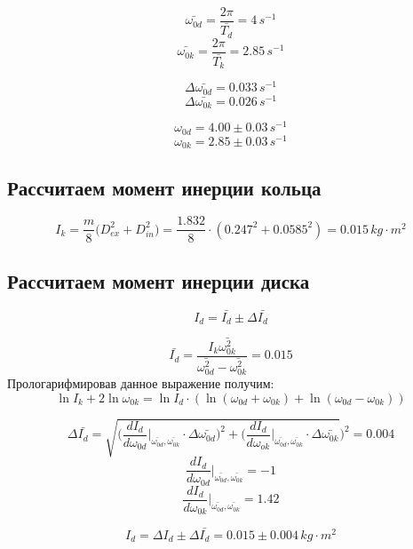 \documentclass[a4paper,12pt]{report}
\begin{document}
\[ \bar{\omega_{0d}} = \frac{2\pi}{\bar{T_d}} = 4 \, s^{-1} \]
\[ \bar{\omega_{0k}} = \frac{2\pi}{\bar{T_k}} = 2.85 \, s^{-1} \]

\[ \Delta \bar{\omega_{0d}} = 0.033 \, s^{-1} \]
\[ \Delta \bar{\omega_{0k}} =  0.026 \, s^{-1}\]

\[ \omega_{0d} = 4.00 \pm 0.03 \, s^{-1} \]
\[ \omega_{0k} = 2.85 \pm 0.03 \, s^{-1} \]

\subsection*{Рассчитаем момент инерции кольца}

\[ I_k = \frac{m}{8}\biggl( D_{ex}^2 + D_{in}^2\biggr) = \frac{1.832}{8} \cdot (0.247^2 + 0.0585^2) = 0.015 \, kg\cdot m^2 \]

\subsection*{Рассчитаем момент инерции диска}

\[ I_d = \bar{I_d} \pm \Delta \bar{I_d} \]

\[ \bar{I_d} = \frac{I_k\bar{\omega_{0k}^2}}{\bar{\omega_{0d}^2}-\bar{\omega_{0k}^2}} = 0.015\]
Прологарифмировав данное выражение получим:
\[ \ln I_k + 2\ln \omega_{0k} = \ln I_d \cdot (\ln (\omega_{0d} + \omega_{0k} ) + \ln (\omega_{0d} - \omega_{0k})) \]

\[ \Delta \bar{I_d} = \sqrt{\biggl(\frac{dI_d}{d\omega_{0d}}\bigg \vert_{\bar{\omega_{0d}},\bar{\omega_{0k}}}\cdot \Delta \bar{\omega_{0d}}\biggr)^2 + \biggl(\frac{dI_d}{d\omega_{ok}}\bigg \vert_{\bar{\omega_{0d}},\bar{\omega_{0k}}}\cdot \Delta \bar{\omega_{0k}}}\biggr)^2 = 0.004\]
\[ \frac{dI_d}{d\omega_{0d}}\bigg \vert_{\bar{\omega_{0d}},\bar{\omega_{0k}}} = -1 \]
\[ \frac{dI_d}{d\omega_{0k}}\bigg \vert_{\bar{\omega_{0d}},\bar{\omega_{0k}}} = 1.42 \]

\[ I_d = \Delta I_d \pm \Delta \bar{I_d} = 0.015 \pm 0.004 \, kg\cdot m^2\]


\newpage
\end{document}
